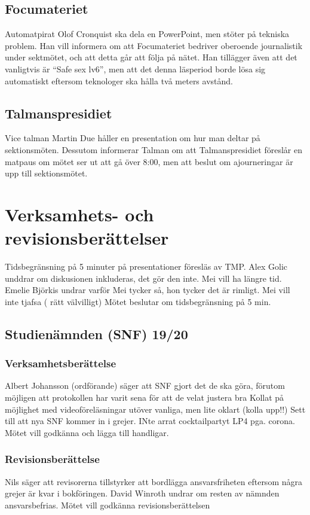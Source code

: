 \documentclass[hidelinks]{sektionsmote}
\begin{document}
\subsection{Focumateriet}
Automatpirat Olof Cronquist ska dela en PowerPoint, men stöter på tekniska problem.
Han vill informera om att Focumateriet bedriver oberoende journalistik under sektmötet, och att detta går att följa på nätet.
Han tillägger även att det vanligtvis är \enquote{Safe sex lv6}, men att det denna läsperiod borde lösa sig automatiskt eftersom teknologer ska hålla två meters avstånd.

\subsection{Talmanspresidiet}
Vice talman Martin Due håller en presentation om hur man deltar på sektionsmöten.
Dessutom informerar Talman om att Talmanspresidiet föreslår en matpaus om mötet ser ut att gå över 8:00, men att beslut om ajourneringar är upp till sektionsmötet.


\section{Verksamhets- och revisionsberättelser}
Tidsbegränsning på 5 minuter på presentationer föresläs av TMP.
Alex Golic unddrar om diskusionen inkluderas, det gör den inte.
Mei vill ha längre tid.
Emelie Björkis undrar varför Mei tycker så, hon tycker det är rimligt.
Mei vill inte tjafsa ( rätt välvilligt)
Mötet beslutar om tidsbegränsning på 5 min.

\subsection{Studienämnden (SNF) 19/20}

\subsubsection{Verksamhetsberättelse}
Albert Johansson (ordförande) säger att SNF gjort det de ska göra, förutom möjligen att protokollen har varit sena för att de velat justera bra
Kollat på möjlighet med videoföreläsningar utöver vanliga, men lite oklart (kolla upp!!)
Sett till att nya SNF kommer in i grejer.
INte arrat cocktailpartyt LP4 pga. corona.
Mötet vill godkänna och lägga till handligar.

\subsubsection{Revisionsberättelse}
Nils säger att revisorerna tillstyrker att bordlägga ansvarsfriheten eftersom några grejer är kvar i bokföringen.
David Winroth undrar om resten av nämnden ansvarsbefrias.
Mötet vill godkänna revisionsberättelsen
\end{document}
